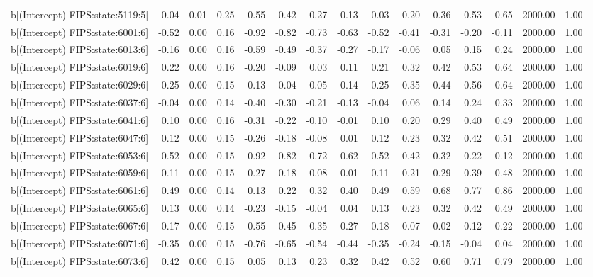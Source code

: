 \begin{table}[ht]
\begin{tabular}{rrrrrrrrrrrrrrr}
  b[(Intercept) FIPS:state:5119:5] & 0.04 & 0.01 & 0.25 & -0.55 & -0.42 & -0.27 & -0.13 & 0.03 & 0.20 & 0.36 & 0.53 & 0.65 & 2000.00 & 1.00 \\ 
  b[(Intercept) FIPS:state:6001:6] & -0.52 & 0.00 & 0.16 & -0.92 & -0.82 & -0.73 & -0.63 & -0.52 & -0.41 & -0.31 & -0.20 & -0.11 & 2000.00 & 1.00 \\ 
  b[(Intercept) FIPS:state:6013:6] & -0.16 & 0.00 & 0.16 & -0.59 & -0.49 & -0.37 & -0.27 & -0.17 & -0.06 & 0.05 & 0.15 & 0.24 & 2000.00 & 1.00 \\ 
  b[(Intercept) FIPS:state:6019:6] & 0.22 & 0.00 & 0.16 & -0.20 & -0.09 & 0.03 & 0.11 & 0.21 & 0.32 & 0.42 & 0.53 & 0.64 & 2000.00 & 1.00 \\ 
  b[(Intercept) FIPS:state:6029:6] & 0.25 & 0.00 & 0.15 & -0.13 & -0.04 & 0.05 & 0.14 & 0.25 & 0.35 & 0.44 & 0.56 & 0.64 & 2000.00 & 1.00 \\ 
  b[(Intercept) FIPS:state:6037:6] & -0.04 & 0.00 & 0.14 & -0.40 & -0.30 & -0.21 & -0.13 & -0.04 & 0.06 & 0.14 & 0.24 & 0.33 & 2000.00 & 1.00 \\ 
  b[(Intercept) FIPS:state:6041:6] & 0.10 & 0.00 & 0.16 & -0.31 & -0.22 & -0.10 & -0.01 & 0.10 & 0.20 & 0.29 & 0.40 & 0.49 & 2000.00 & 1.00 \\ 
  b[(Intercept) FIPS:state:6047:6] & 0.12 & 0.00 & 0.15 & -0.26 & -0.18 & -0.08 & 0.01 & 0.12 & 0.23 & 0.32 & 0.42 & 0.51 & 2000.00 & 1.00 \\ 
  b[(Intercept) FIPS:state:6053:6] & -0.52 & 0.00 & 0.15 & -0.92 & -0.82 & -0.72 & -0.62 & -0.52 & -0.42 & -0.32 & -0.22 & -0.12 & 2000.00 & 1.00 \\ 
  b[(Intercept) FIPS:state:6059:6] & 0.11 & 0.00 & 0.15 & -0.27 & -0.18 & -0.08 & 0.01 & 0.11 & 0.21 & 0.29 & 0.39 & 0.48 & 2000.00 & 1.00 \\ 
  b[(Intercept) FIPS:state:6061:6] & 0.49 & 0.00 & 0.14 & 0.13 & 0.22 & 0.32 & 0.40 & 0.49 & 0.59 & 0.68 & 0.77 & 0.86 & 2000.00 & 1.00 \\ 
  b[(Intercept) FIPS:state:6065:6] & 0.13 & 0.00 & 0.14 & -0.23 & -0.15 & -0.04 & 0.04 & 0.13 & 0.23 & 0.32 & 0.42 & 0.49 & 2000.00 & 1.00 \\ 
  b[(Intercept) FIPS:state:6067:6] & -0.17 & 0.00 & 0.15 & -0.55 & -0.45 & -0.35 & -0.27 & -0.18 & -0.07 & 0.02 & 0.12 & 0.22 & 2000.00 & 1.00 \\ 
  b[(Intercept) FIPS:state:6071:6] & -0.35 & 0.00 & 0.15 & -0.76 & -0.65 & -0.54 & -0.44 & -0.35 & -0.24 & -0.15 & -0.04 & 0.04 & 2000.00 & 1.00 \\ 
  b[(Intercept) FIPS:state:6073:6] & 0.42 & 0.00 & 0.15 & 0.05 & 0.13 & 0.23 & 0.32 & 0.42 & 0.52 & 0.60 & 0.71 & 0.79 & 2000.00 & 1.00 \\ 

\end{tabular}
\end{table}
